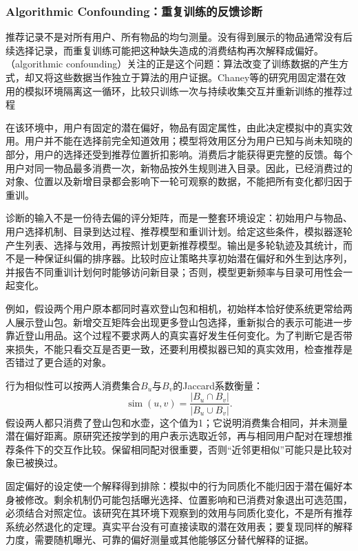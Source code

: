 \Needspace{100mm}
\subsubsection{Algorithmic Confounding：重复训练的反馈诊断}
\label{sec:rs-algorithmic-confounding}

推荐记录不是对所有用户、所有物品的均匀测量。没有得到展示的物品通常没有后续选择记录，而重复训练可能把这种缺失造成的消费结构再次解释成偏好。（algorithmic confounding）关注的正是这个问题：算法改变了训练数据的产生方式，却又将这些数据当作独立于算法的用户证据。Chaney等的研究用固定潜在效用的模拟环境隔离这一循环，比较只训练一次与持续收集交互并重新训练的推荐过程

在该环境中，用户有固定的潜在偏好，物品有固定属性，由此决定模拟中的真实效用。用户并不能在选择前完全知道效用；模型将效用区分为用户已知与尚未知晓的部分，用户的选择还受到推荐位置折扣影响。消费后才能获得更完整的反馈。每个用户对同一物品最多消费一次，新物品按外生规则进入目录。因此，已经消费过的对象、位置以及新增目录都会影响下一轮可观察的数据，不能把所有变化都归因于重训。

诊断的输入不是一份待去偏的评分矩阵，而是一整套环境设定：初始用户与物品、用户选择机制、目录到达过程、推荐模型和重训计划。给定这些条件，模拟器逐轮产生列表、选择与效用，再按照计划更新推荐模型。输出是多轮轨迹及其统计，而不是一种保证纠偏的排序器。比较时应让策略共享初始潜在偏好和外生到达序列，并报告不同重训计划何时能够访问新目录；否则，模型更新频率与目录可用性会一起变化。

例如，假设两个用户原本都同时喜欢登山包和相机，初始样本恰好使系统更常给两人展示登山包。新增交互矩阵会出现更多登山包选择，重新拟合的表示可能进一步靠近登山用品。这个过程不要求两人的真实喜好发生任何变化。为了判断它是否带来损失，不能只看交互是否更一致，还要利用模拟器已知的真实效用，检查推荐是否错过了更合适的对象。

行为相似性可以按两人消费集合$B_u$与$B_v$的Jaccard系数衡量：
\[
 \operatorname{sim}(u,v)
 =\frac{|B_u\cap B_v|}{|B_u\cup B_v|}.
\]
假设两人都只消费了登山包和水壶，这个值为1；它说明消费集合相同，并未测量潜在偏好距离。原研究还按学到的用户表示选取近邻，再与相同用户配对在理想推荐条件下的交互作比较。保留相同配对很重要，否则“近邻更相似”可能只是比较对象已被换过。

固定偏好的设定使一个解释得到排除：模拟中的行为同质化不能归因于潜在偏好本身被修改。剩余机制仍可能包括曝光选择、位置影响和已消费对象退出可选范围，必须结合对照定位。该研究在其环境下观察到的效用与同质化变化，不是所有推荐系统必然退化的定理。真实平台没有可直接读取的潜在效用表；要复现同样的解释力度，需要随机曝光、可靠的偏好测量或其他能够区分替代解释的证据。

